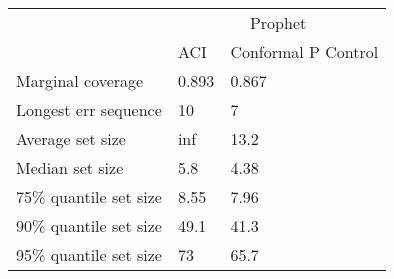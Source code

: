 \begin{tabular}{lll}
\toprule
& \multicolumn{2}{c}{Prophet} \\
& ACI & Conformal P Control \\
\midrule
Marginal coverage & 0.893 & 0.867 \\
Longest err sequence & 10 & 7 \\
Average set size & inf & 13.2 \\
Median set size & 5.8 & 4.38 \\
75\% quantile set size & 8.55 & 7.96 \\
90\% quantile set size & 49.1 & 41.3 \\
95\% quantile set size & 73 & 65.7 \\
\bottomrule
\end{tabular}
